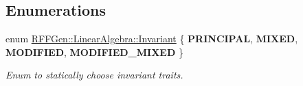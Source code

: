 \subsection*{Enumerations}
\begin{DoxyCompactItemize}
\item 
enum \hyperlink{group__LinearAlgebraGroup_gaddcbe266c25a46f729eb8b89841467d9}{R\-F\-F\-Gen\-::\-Linear\-Algebra\-::\-Invariant} \{ {\bfseries P\-R\-I\-N\-C\-I\-P\-A\-L}, 
{\bfseries M\-I\-X\-E\-D}, 
{\bfseries M\-O\-D\-I\-F\-I\-E\-D}, 
{\bfseries M\-O\-D\-I\-F\-I\-E\-D\-\_\-\-M\-I\-X\-E\-D}
 \}
\begin{DoxyCompactList}\small\item\em Enum to statically choose invariant traits. \end{DoxyCompactList}\end{DoxyCompactItemize}
